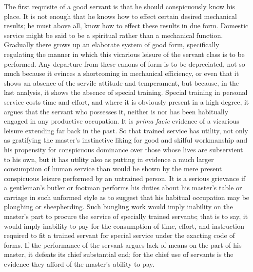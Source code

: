 \documentclass[12pt]{report}
\begin{document}
The first requisite of a good servant is that he should conspicuously
know his place. It is not enough that he knows how to effect certain
desired mechanical results; he must above all, know how to effect these
results in due form. Domestic service might be said to be a spiritual
rather than a mechanical function. Gradually there grows up an elaborate
system of good form, specifically regulating the manner in which this
vicarious leisure of the servant class is to be performed. Any departure
from these canons of form is to be depreciated, not so much because it
evinces a shortcoming in mechanical efficiency, or even that it shows
an absence of the servile attitude and temperament, but because, in
the last analysis, it shows the absence of special training. Special
training in personal service costs time and effort, and where it is
obviously present in a high degree, it argues that the servant who
possesses it, neither is nor has been habitually engaged in any
productive occupation. It is \emph{prima facie} evidence of a vicarious leisure
extending far back in the past. So that trained service has utility, not
only as gratifying the master's instinctive liking for good and skilful
workmanship and his propensity for conspicuous dominance over those
whose lives are subservient to his own, but it has utility also as
putting in evidence a much larger consumption of human service than
would be shown by the mere present conspicuous leisure performed by an
untrained person. It is a serious grievance if a gentleman's butler or
footman performs his duties about his master's table or carriage in
such unformed style as to suggest that his habitual occupation may be
ploughing or sheepherding. Such bungling work would imply inability on
the master's part to procure the service of specially trained servants;
that is to say, it would imply inability to pay for the consumption
of time, effort, and instruction required to fit a trained servant for
special service under the exacting code of forms. If the performance of
the servant argues lack of means on the part of his master, it defeats
its chief substantial end; for the chief use of servants is the evidence
they afford of the master's ability to pay.
\end{document}
